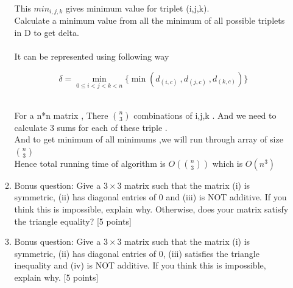 \begin{enumerate}
\begin{enumerate}
{{This $min_{i,j,k}$ gives minimum value for triplet (i,j,k).
\\Calculate a minimum value from all the minimum of all possible triplets in D  to get delta. \\
\\
It can be represented using following way

\[ \delta = \min_{0 \le i<j<k<n} \{\min(d_{(i,c)} \ , d_{(j,c)}\ ,d_{(k,c)} )\}\]

\\For a n*n matrix , There ${n \choose 3}$ combinations of i,j,k . And we need to calculate 3 sums for each of these triple .\\
And to get minimum of all minimums ,we will run through array of size  ${n \choose 3}$\\
Hence total running time of algorithm is $O\left(  {n \choose 3}\right)$ which is $O(n^3)$
\vspace{5cm}
}}

\clearpage
\item Bonus question: Give a $3 \times 3$ matrix such that the matrix (i) is symmetric, (ii) has diagonal entries of $0$ and (iii) is NOT additive. If you think this is impossible, explain why. Otherwise, does your matrix satisfy the triangle equality? [5 points]

\clearpage
\item Bonus question: Give a $3 \times 3$ matrix such that the matrix (i) is symmetric, (ii) has diagonal entries of $0$, (iii) satisfies the triangle inequality and (iv) is NOT additive. If you think this is impossible, explain why. [5 points]


\end{enumerate}
\end{enumerate}
